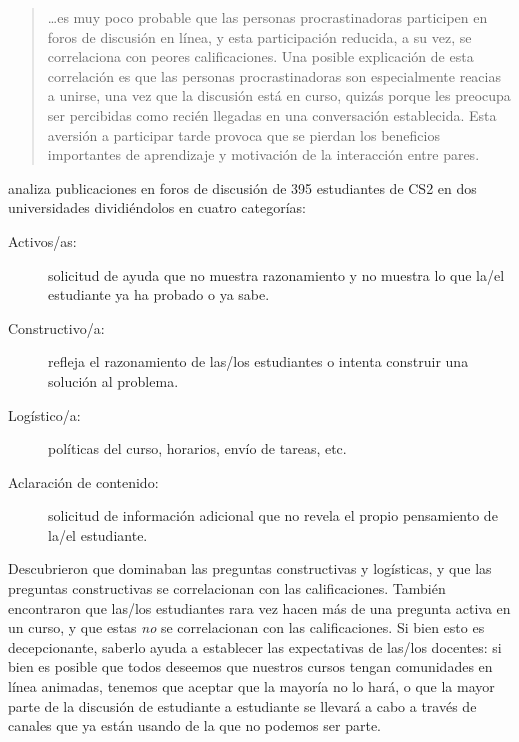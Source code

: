 \begin{quote}

  {\ldots}es muy poco probable que las personas procrastinadoras participen en foros de discusión en línea,
  y esta participación reducida,
  a su vez,
  se correlaciona con peores calificaciones.
  Una posible explicación de esta correlación es que
  las personas procrastinadoras son especialmente reacias a unirse, una vez que la discusión está en curso,
  quizás porque les preocupa ser percibidas como recién llegadas en una conversación establecida.
  Esta aversión a participar tarde
  provoca que se pierdan los beneficios importantes de aprendizaje y motivación de la interacción entre pares.

\end{quote}

\cite{Vell2017} analiza publicaciones en foros de discusión de 395 estudiantes de CS2 en dos universidades
dividiéndolos en cuatro categorías:

\begin{description}

\item[Activos/as:]
  solicitud de ayuda que no muestra razonamiento
  y no muestra lo que la/el estudiante ya ha probado o ya sabe.

\item[Constructivo/a:]
  refleja el razonamiento de las/los estudiantes
  o intenta construir una solución al problema.

\item[Logístico/a:]
  políticas del curso, horarios, envío de tareas, etc.
 
\item[Aclaración de contenido:]
  solicitud de información adicional
  que no revela el propio pensamiento de la/el estudiante.

\end{description}

Descubrieron que dominaban las preguntas constructivas y logísticas,
y que las preguntas constructivas se correlacionan con las calificaciones.
También encontraron que las/los estudiantes rara vez hacen más de una pregunta activa en un curso,
y que estas \emph{no} se correlacionan con las calificaciones.
Si bien esto es decepcionante,
saberlo ayuda a establecer las expectativas de las/los docentes:
si bien es posible que todos deseemos que nuestros cursos tengan comunidades en línea animadas,
tenemos que aceptar que la mayoría no lo hará,
o que la mayor parte de la discusión de estudiante a estudiante se llevará a cabo
a través de canales que ya están usando
de la que no podemos ser parte.

